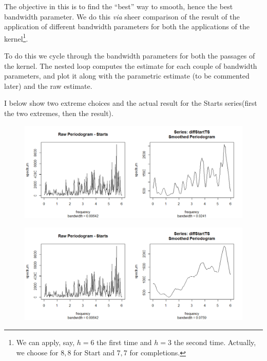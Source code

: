 \documentclass[12pt]{article} %
\begin{document}
The objective in this is to find the ``best'' way to smooth, hence the best bandwidth parameter. We do this {\em via} sheer comparison of the result of the application of different bandwidth parameters for both the applications of the kernel\footnote{We can apply, say, $h=6$ the first time and $h=3$ the second time. Actually, we choose for $8,8$ for Start and $7,7$ for completions.}.

To do this we cycle through the bandwidth parameters for both the passages of the kernel. The nested loop computes the estimate for each couple of bandwidth parameters, and plot it along with the parametric estimate (to be commented later) and the raw estimate. 

I below show two extreme choices and the actual result for the Starts series(first the two extremes, then the result).

\begin{figure}[h!]
\begin{center}
\includegraphics[scale=0.4]{spec33}
\caption{}
\end{center}
\end{figure}

\begin{figure}[h!]
\begin{center}
\includegraphics[scale=0.4]{spec1010}
\caption{}
\end{center}
\end{figure}
\end{document}
